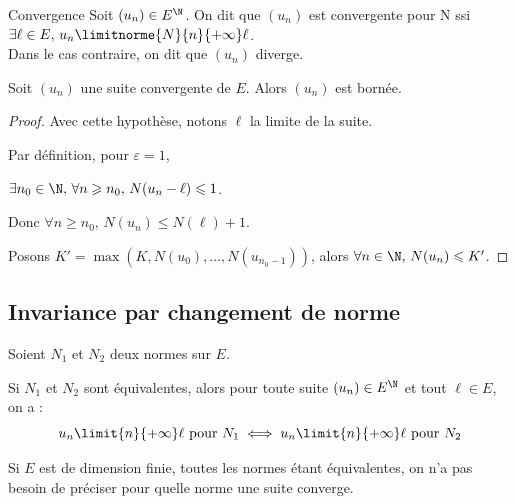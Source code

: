 \begin{definition}{Convergence}{}
    Soit $(u_n) \in E^{\N}$. On dit que $(u_n)$ est convergente pour N ssi 
    $\exists \ell \in E, \, u_n \limitnorme{N}{n}{+\infty} \ell$. \\

    Dans le cas contraire, on dit que $(u_n)$ diverge.
\end{definition}

\begin{definition}{}{}
    Soit $(u_n)$ une suite convergente de $E$. Alors $(u_n)$ est bornée.
\end{definition}


\begin{proof}
    Avec cette hypothèse, notons $\ell$ la limite de la suite. 

    Par définition, pour $\varepsilon = 1$,
    
    $\exists n_0 \in \N, \, \forall n \geqslant n_0, \, N(u_n - \ell) \leqslant 1$.

    Donc $\forall n \geqslant n_0, \, N(u_n) \leqslant N(\ell) + 1$.

    Posons $K' = \max(K, N(u_0), \ldots, N(u_{n_0 - 1}))$, alors $\forall n \in \N, \, N(u_n) \leqslant K'$.
\end{proof}

\subsection{Invariance par changement de norme}

\begin{theoreme}{}{}
    Soient $N_1$ et $N_2$ deux normes sur $E$. 

    Si $N_1$ et $N_2$ sont équivalentes, alors pour toute suite $(u_n) \in E^{\N}$ 
    et tout $\ell \in E$, on a :
    \[u_n \limit{n}{+\infty} \ell \text{ pour } N_1 \iff u_n \limit{n}{+\infty} \ell \text{ pour } N_2\]
\end{theoreme}

\begin{remarque}
    Si $E$ est de dimension finie, toutes les normes étant équivalentes, on n'a pas besoin de préciser pour quelle norme une suite converge.
\end{remarque}


